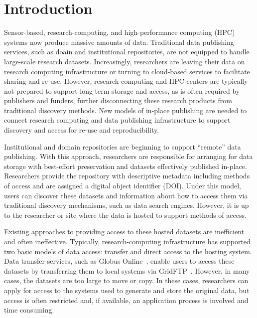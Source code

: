 \documentclass{sig-alternate}
\begin{document}

\section{Introduction}

Sensor-based, research-computing, and high-performance computing (HPC) systems now produce massive amounts of data.  Traditional data publishing services, such as doain and institutional repositories, are not equipped to handle large-scale research datasets.  Increasingly, researchers are leaving their data on research computing infrastructure or turning to cloud-based services to facilitate sharing and re-use. However, research-computing and HPC centers are typically not prepared to support long-term storage and access, as is often required by publishers and funders, further disconnecting these research products from traditional discovery methods. New models of in-place publishing are needed to connect research computing and data publishing infrastructure to support discovery and access for re-use and reproducibility.

Institutional and domain repositories are beginning to support ``remote'' data publishing.  With this approach, researchers are responsible for arranging for data storage with best-effort preservation and datasets effectively published in-place. Researchers provide the repository with descriptive metadata including methods of access and are assigned a digital object identifier (DOI).  Under this model, users can discover these datasets and information about how to access them via traditional discovery mechanisms, such as data search engines. However, it is up to the researcher or site where the data is hosted to support methods of access.

Existing approaches to providing access to these hosted datasets are inefficient and often ineffective.  Typically, research-computing infrastructure has supported two basic models of data access: transfer and direct access to the hosting system.  Data transfer services, such as Globus Online~\cite{Foster11}, enable users to access these datasets by transferring them to local systems via GridFTP~\cite{Allcock05}.  However, in many cases, the datasets are too large to move or copy. In these cases, researchers can apply for access to the systems used to generate and store the original data, but access is often restricted and, if available, an application process is involved and time consuming.
\end{document}
